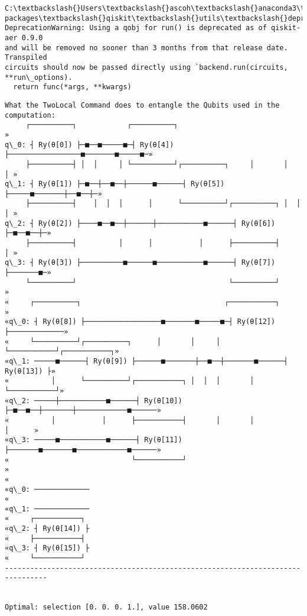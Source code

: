 \documentclass[11pt]{article}
\begin{document}
    \begin{Verbatim}[commandchars=\\\{\}]
C:\textbackslash{}Users\textbackslash{}ascoh\textbackslash{}anaconda3\textbackslash{}lib\textbackslash{}site-packages\textbackslash{}qiskit\textbackslash{}utils\textbackslash{}deprecation.py:62:
DeprecationWarning: Using a qobj for run() is deprecated as of qiskit-aer 0.9.0
and will be removed no sooner than 3 months from that release date. Transpiled
circuits should now be passed directly using `backend.run(circuits,
**run\_options).
  return func(*args, **kwargs)
    \end{Verbatim}

    \begin{Verbatim}[commandchars=\\\{\}]
What the TwoLocal Command does to entangle the Qubits used in the computation:
     ┌──────────┐            ┌──────────┐                                 »
q\_0: ┤ Ry(θ[0]) ├─■──■─────■─┤ Ry(θ[4]) ├─────────────────■───────■─────■─»
     ├──────────┤ │  │     │ └──────────┘┌──────────┐     │       │     │ »
q\_1: ┤ Ry(θ[1]) ├─■──┼──■──┼──────■──────┤ Ry(θ[5]) ├─────■───────┼──■──┼─»
     ├──────────┤    │  │  │      │      └──────────┘┌──────────┐ │  │  │ »
q\_2: ┤ Ry(θ[2]) ├────■──■──┼──────┼───────────■──────┤ Ry(θ[6]) ├─■──■──┼─»
     ├──────────┤          │      │           │      ├──────────┤       │ »
q\_3: ┤ Ry(θ[3]) ├──────────■──────■───────────■──────┤ Ry(θ[7]) ├───────■─»
     └──────────┘                                    └──────────┘         »
«     ┌──────────┐                                  ┌───────────┐             »
«q\_0: ┤ Ry(θ[8]) ├──────────────────■───────■─────■─┤ Ry(θ[12]) ├─────────────»
«     └──────────┘┌──────────┐      │       │     │ └───────────┘┌───────────┐»
«q\_1: ─────■──────┤ Ry(θ[9]) ├──────■───────┼──■──┼───────■──────┤ Ry(θ[13]) ├»
«          │      └──────────┘┌───────────┐ │  │  │       │      └───────────┘»
«q\_2: ─────┼───────────■──────┤ Ry(θ[10]) ├─■──■──┼───────┼────────────■──────»
«          │           │      ├───────────┤       │       │            │      »
«q\_3: ─────■───────────■──────┤ Ry(θ[11]) ├───────■───────■────────────■──────»
«                             └───────────┘                                   »
«
«q\_0: ─────────────
«
«q\_1: ─────────────
«     ┌───────────┐
«q\_2: ┤ Ry(θ[14]) ├
«     ├───────────┤
«q\_3: ┤ Ry(θ[15]) ├
«     └───────────┘
--------------------------------------------------------------------------------


Optimal: selection [0. 0. 0. 1.], value 158.0602


\end{Verbatim}
\end{document}
